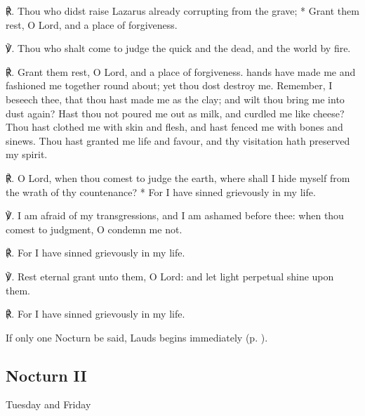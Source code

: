 ℟. Thou who didst raise Lazarus {\dag} already corrupting from the grave; * Grant them rest, O Lord, and a place of forgiveness.\par
℣. Thou who shalt come to judge the quick and the dead, and the world by fire.\par
℟. Grant them rest, O Lord, and a place of forgiveness.
 hands have made me and fashioned me together round about; yet thou dost destroy me. Remember, I beseech thee, that thou hast made me as the clay; and wilt thou bring me into dust again? Hast thou not poured me out as milk, and curdled me like cheese? Thou hast clothed me with skin and flesh, and hast fenced me with bones and sinews. Thou hast granted me life and favour, and thy visitation hath preserved my spirit.\par
℟. O Lord, {\dag} when thou comest to judge the earth, where shall I hide myself from the wrath of thy countenance? * For I have sinned grievously in my life.\par
℣. I am afraid of my transgressions, and I am ashamed before thee: when thou comest to judgment, O condemn me not.\par
℟. For I have sinned grievously in my life.\par
℣. Rest eternal grant unto them, O Lord: and let light perpetual shine upon them.\par
℟. For I have sinned grievously in my life.
\begin{rubric}
    {If only one Nocturn be said, Lauds begins immediately (p. \pageref{laudsdead}).}
\end{rubric}
\subsection{Nocturn II}
\begin{inhead}
    {Tuesday and Friday}
\end{inhead}
